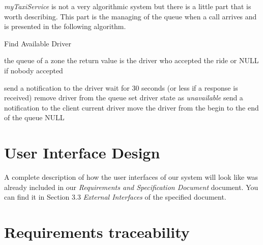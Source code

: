 \documentclass[a4paper]{article}
\begin{document}
\emph{myTaxiService} is not a very algorithmic system but there is a little part that is worth describing.
This part is the managing of the queue when a call arrives and is presented in the following algorithm.

\begin{center}
\begin{minipage}{.8\textwidth}
\begin{algorithm}[H]
\caption{Find Available Driver}
\label{alg:findavailabledriver}
\begin{algorithmic}
    
    \REQUIRE the queue of a zone
    \ENSURE the return value is the driver who accepted the ride or NULL if nobody accepted
    
        \STATE send a notification to the driver
        \STATE wait for 30 seconds (or less if a response is received)
            \STATE remove driver from the queue
            \STATE set driver state as \emph{unavailable}
            \STATE send a notification to the client
            \RETURN current driver
            \STATE move the driver from the begin to the end of the queue
        \ENDIF
    \ENDFOR
    \RETURN NULL
\end{algorithmic}
\end{algorithm}
\end{minipage}
\end{center}

\section{User Interface Design}
A complete description of how the user interfaces of our system will look like was already included in our \emph{Requirements and Specification Document} document. You can find it in Section 3.3 \emph{External Interfaces} of the specified document.

\section{Requirements traceability}

\renewcommand{\arraystretch}{1.15}
\def \customTableWidth{12cm}
\end{document}

